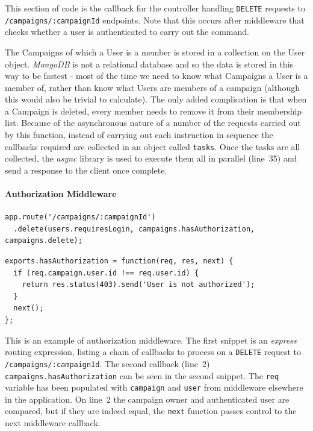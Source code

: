 \documentclass{article}
\begin{document}
	This section of code is the callback for the controller handling \texttt{DELETE} requests to \texttt{/campaigns/:campaignId} endpoints. Note that this occurs after middleware that checks whether a user is authenticated to carry out the command.

	The Campaigns of which a User is a member is stored in a collection on the User object. \emph{MongoDB} is not a relational database and so the data is stored in this way to be fastest - most of the time we need to know what Campaigns a User is a member of, rather than know what Users are members of a campaign (although this would also be trivial to calculate). The only added complication is that when a Campaign is deleted, every member needs to remove it from their membership list. Because of the asynchronous nature of a number of the requests carried out by this function, instead of carrying out each instruction in sequence the callbacks required are collected in an object called \texttt{tasks}. Once the tasks are all collected, the \emph{async} library is used to execute them all in parallel (line~35) and send a response to the client once complete.

	\paragraph{Authorization Middleware}

	\begin{verbatim}
app.route('/campaigns/:campaignId')
  .delete(users.requiresLogin, campaigns.hasAuthorization, campaigns.delete);
	\end{verbatim}

	\begin{verbatim}
exports.hasAuthorization = function(req, res, next) {
  if (req.campaign.user.id !== req.user.id) {
    return res.status(403).send('User is not authorized');
  }
  next();
};
	\end{verbatim}

	This is an example of authorization middleware. The first snippet is an \emph{express} routing expression, listing a chain of callbacks to process on a \texttt{DELETE} request to \texttt{/campaigns/:campaignId}. The second callback (line~2) \texttt{campaigns.hasAuthorization} can be seen in the second snippet. The \texttt{req} variable has been populated with \texttt{campaign} and \texttt{user} from middleware elsewhere in the application. On line~2 the campaign owner and authenticated user are compared, but if they are indeed equal, the \texttt{next} function passes control to the next middleware callback.
\end{document}
